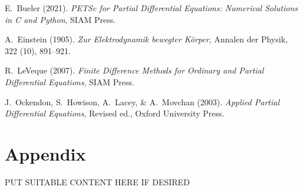 \documentclass[11pt]{article}
\begin{document}
\begin{thebibliography}{2}  %

E.~Bueler (2021).
\textit{PETSc for Partial Differential Equations: Numerical Solutions in C and Python},
SIAM Press.

A.~Einstein (1905). 
\textit{Zur Elektrodynamik bewegter K{\"o}rper},
Annalen der Physik, 322 (10), 891--921.

R.~LeVeque (2007).
\textit{Finite Difference Methods for Ordinary and Partial Differential Equations},
SIAM Press.

J.~Ockendon, S.~Howison, A.~Lacey, \& A.~Movchan (2003).
\textit{Applied Partial Differential Equations},
Revised ed., Oxford University Press.

\end{thebibliography}

\appendix
\section{Appendix}  PUT SUITABLE CONTENT HERE IF DESIRED
\end{document}

